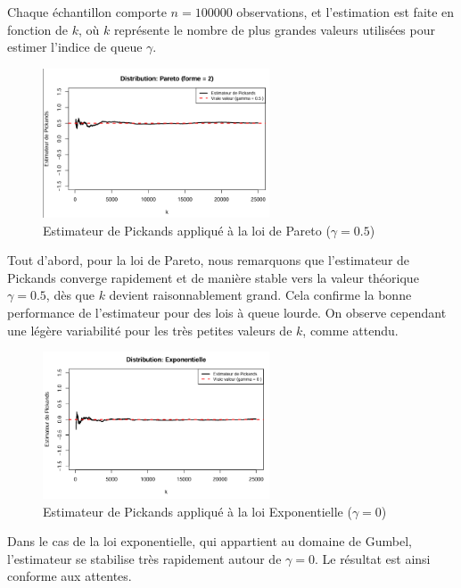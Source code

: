 \documentclass{article}
\theoremstyle{plain}
\theoremstyle{definition}
\theoremstyle{plain}
\begin{document}
Chaque échantillon comporte $n = 100000$ observations, et l’estimation est faite en fonction de $k$, où \(k\) représente le nombre de plus grandes valeurs utilisées pour estimer l’indice de queue \(\gamma\).

\begin{figure}[H]
    \centering
    \includegraphics[width=0.6\textwidth]{./image_hill_pickands/pareto_pickands.png}
    \caption{Estimateur de Pickands appliqué à la loi de Pareto ($\gamma = 0.5$)}
\end{figure}
Tout d'abord, pour la loi de Pareto, nous remarquons que l'estimateur de Pickands converge rapidement et de manière stable vers la valeur théorique $\gamma = 0.5$, dès que $k$ devient raisonnablement grand. Cela confirme la bonne performance de l’estimateur pour des lois à queue lourde. On observe cependant une légère variabilité pour les très petites valeurs de $k$, comme attendu.


\begin{figure}[H]
    \centering
    \includegraphics[width=0.6\textwidth]{./image_hill_pickands/exponentielle_pickands.png}
    \caption{Estimateur de Pickands appliqué à la loi Exponentielle ($\gamma = 0$)}
\end{figure}
Dans le cas de la loi exponentielle, qui appartient au domaine de Gumbel, l’estimateur se stabilise très rapidement autour de $\gamma = 0$. Le résultat est ainsi conforme aux attentes.
\end{document}
